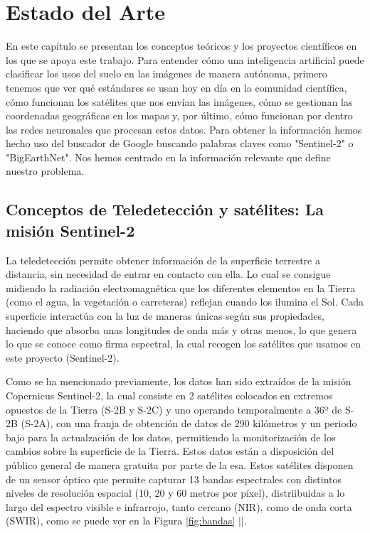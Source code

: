 \chapter[Estado del Arte]{Estado del Arte}
\label{cp:state-of-the-art}

En este capítulo se presentan los conceptos teóricos y los proyectos científicos en los que se apoya este trabajo. Para entender cómo una 
inteligencia artificial puede clasificar los usos del suelo en las imágenes de manera autónoma, primero tenemos que ver qué estándares se 
usan hoy en día en la comunidad científica, cómo funcionan los satélites que nos envían las imágenes, cómo se gestionan las coordenadas 
geográficas en los mapas y, por último, cómo funcionan por dentro las redes neuronales que procesan estos datos. Para obtener la información
hemos hecho uso del buscador de Google buscando palabras claves como "Sentinel-2" o "BigEarthNet". Nos hemos centrado en la información 
relevante que define nuestro problema. 

\section{Conceptos de Teledetección y satélites: La misión Sentinel-2}
\label{sentinel_2}

La teledetección permite obtener información de la superficie terrestre a distancia, sin necesidad de entrar en contacto con ella. Lo cual se 
consigue midiendo la radiación electromagnética que los diferentes elementos en la Tierra (como el agua, la vegetación o carreteras) reflejan
cuando los ilumina el Sol. Cada superficie interactúa con la luz de maneras únicas según sus propiedades, haciendo que absorba unas longitudes
de onda más y otras menos, lo que genera lo que se conoce como firma espectral, la cual recogen los satélites que usamos en este proyecto (Sentinel-2).


Como se ha mencionado previamente, los datos han sido extraídos de la misión Copernicus Sentinel-2, la cual consiste en 2 satélites colocados
en extremos opuestos de la Tierra (S-2B y S-2C) y uno operando temporalmente a 36º de S-2B (S-2A), con una franja de obtención de datos de 290 
kilómetros y un periodo bajo para la actualzación de los datos, permitiendo la monitorización de los cambios sobre la superficie de la Tierra.
Estos datos están a disposición del público general de manera gratuita por parte de la \acrfull{esa}. Estos satélites disponen de un sensor
óptico que permite capturar 13 bandas espectrales con distintos niveles de resolución espacial (10, 20 y 60 metros por píxel), distriibuidas a 
lo largo del espectro visible e infrarrojo, tanto cercano (NIR), como de onda corta (SWIR), como se puede ver en la Figura \autoref{fig:bandas} |\citet{dataspace.copernicus.eu}|.

